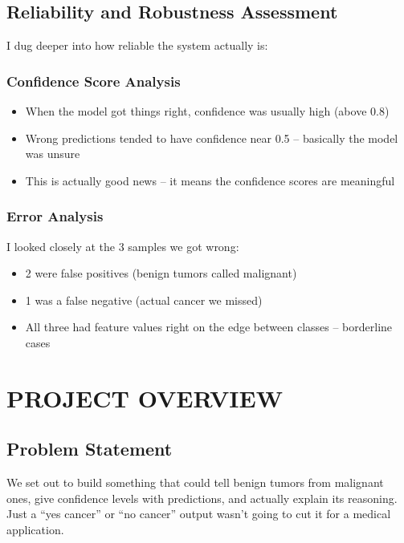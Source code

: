 \documentclass[12pt]{article}
\begin{document}
\subsection{Reliability and Robustness Assessment}

I dug deeper into how reliable the system actually is:

\subsubsection{Confidence Score Analysis}
\begin{itemize}
    \item When the model got things right, confidence was usually high (above 0.8)
    \item Wrong predictions tended to have confidence near 0.5 -- basically the model was unsure
    \item This is actually good news -- it means the confidence scores are meaningful
\end{itemize}

\subsubsection{Error Analysis}
I looked closely at the 3 samples we got wrong:
\begin{itemize}
    \item 2 were false positives (benign tumors called malignant)
    \item 1 was a false negative (actual cancer we missed)
    \item All three had feature values right on the edge between classes -- borderline cases
\end{itemize}

\newpage
\section{PROJECT OVERVIEW}

\subsection{Problem Statement}
We set out to build something that could tell benign tumors from malignant ones, give confidence levels with predictions, and actually explain its reasoning. Just a ``yes cancer'' or ``no cancer'' output wasn't going to cut it for a medical application.
\end{document}
